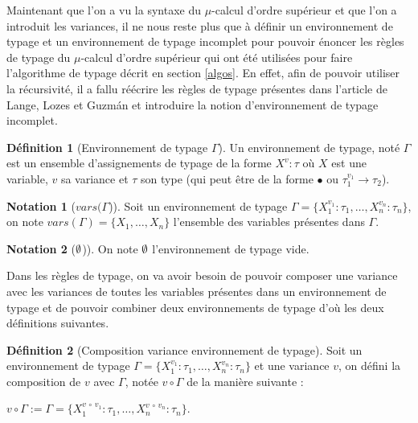 \documentclass{rapport}
\renewcommand{\emptyset}{\font\cmsy = cmsy10 at 10pt
 \hbox{\cmsy \char 59}
}
\theoremstyle{plain}
\theoremstyle{remark}
\theoremstyle{definition}
\newtheorem{notat}{Notation}
\newtheorem{dfn}{Définition}
\begin{document}
Maintenant que l'on a vu la syntaxe du $\mu$-calcul d'ordre supérieur et que l'on a introduit les variances, il ne nous reste plus que à définir un environnement de typage et un environnement de typage incomplet pour pouvoir énoncer les règles de typage du $\mu$-calcul d'ordre supérieur qui ont été utilisées pour faire l'algorithme de typage décrit en section \ref{algos}. En effet, afin de pouvoir utiliser la récursivité, il a fallu réécrire les règles de typage présentes dans l'article de Lange, Lozes et Guzm{\'a}n \citep{lange2014model} et introduire la notion d'environnement de typage incomplet. 

\begin{dfn} [Environnement de typage $\Gamma$] Un environnement de typage, noté $\Gamma$ est un ensemble d'assignements de typage de la forme ${X^v : \tau}$ où $X$ est une variable, $v$ sa variance et $\tau$ son type (qui peut être de la forme $\bullet$ ou ${\tau_1^{v_1} \rightarrow \tau_2}$).  
\end{dfn}

\begin{notat} [$vars(\Gamma$)] Soit un environnement de typage ${\Gamma = \{X_1^{v_1} : \tau_1, \ldots, X_n^{v_n} : \tau_n\}}$, on note ${vars(\Gamma) = \{X_1, \ldots, X_n\}}$ l'ensemble des variables présentes dans $\Gamma$.
\end{notat}

\begin{notat} [$\emptyset$)] On note $\emptyset$ l'environnement de typage vide.
\end{notat}

Dans les règles de typage, on va avoir besoin de pouvoir composer une variance avec les variances de toutes les variables présentes dans un environnement de typage et de pouvoir combiner deux environnements de typage d'où les deux définitions suivantes.

\begin{dfn} [Composition variance environnement de typage] Soit un environnement de typage ${\Gamma = \{X_1^{v_1} : \tau_1, \ldots, X_n^{v_n} : \tau_n\}}$ et une variance $v$, on défini la composition de $v$ avec $\Gamma$, notée ${v \circ \Gamma}$ de la manière suivante : 
\begin{center}
${v \circ \Gamma} := {\Gamma = \{X_1^{v \, \circ \, v_1} : \tau_1, \ldots, X_n^{v \, \circ \, v_n} : \tau_n\}}$.
\end{center}
\end{dfn}
\end{document}
